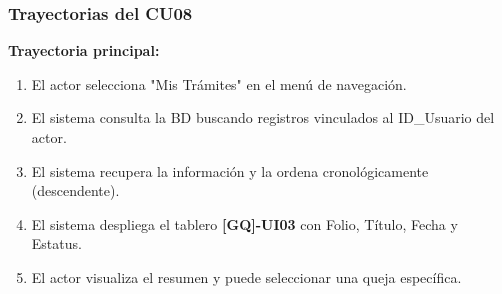 \begin{appendices}
\subsubsection{Trayectorias del CU08}
\textbf{Trayectoria principal:}
\begin{enumerate}[nosep]
    \item El actor selecciona "Mis Trámites" en el menú de navegación.
    \item El sistema consulta la BD buscando registros vinculados al ID\_Usuario del actor.
    \item El sistema recupera la información y la ordena cronológicamente (descendente).
    \item El sistema despliega el tablero \textbf{[GQ]-UI03} con Folio, Título, Fecha y Estatus.
    \item El actor visualiza el resumen y puede seleccionar una queja específica.
\end{enumerate}


\end{appendices}
